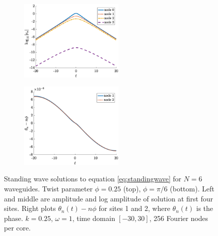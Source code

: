 \documentclass[11pt,reqno]{amsart}
\begin{document}
\begin{figure}
\begin{subfigure}{0.3\linewidth}
    \end{subfigure}
    \begin{subfigure}{0.3\linewidth}
        \caption{}
        \label{fig:m6pi6logamp}
        \includegraphics[width=5cm]{m6phipi6logamp.eps}
    \end{subfigure}
        \begin{subfigure}{0.3\linewidth}
        \caption{}
        \label{fig:m6pi6phase}
        \includegraphics[width=5cm]{m6phipi6phase.eps}
    \end{subfigure}
    \caption{Standing wave solutions to equation \cref{eq:standingwave} for $N=6$ waveguides. Twist parameter $\phi = 0.25$ (top), $\phi = \pi/6$ (bottom). Left and middle are amplitude and log amplitude of solution at first four sites. Right plots $\theta_n(t) - n \phi$ for sites 1 and 2, where $\theta_n(t)$ is the phase. $k=0.25$, $\omega=1$, time domain $[-30,30]$, 256 Fourier nodes per core.}
    \label{fig:m6sol}
\end{figure}
\end{document}
